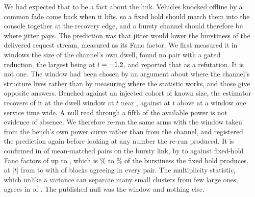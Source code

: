 \documentclass[11pt]{article}
\begin{document}
We had expected that to be a fact about the link. Vehicles knocked offline by a common fade come back when it lifts, so a fixed hold should march them into the console together at the recovery edge, and a bursty channel should therefore be where jitter pays. The prediction was that jitter would lower the burstiness of the delivered request stream, measured as its Fano factor. We first measured it in windows the size of the channel's own dwell, found no pair with a gated reduction, the largest being \jiGeFanoWideSix{} at $t = -1.2{}$, and reported that as a refutation. It is not one. The window had been chosen by an argument about where the channel's structure lives rather than by measuring where the statistic works, and those give opposite answers. Benched against an injected cohort of known size, the estimator recovers \fbBurstWDwell{} of it at the dwell window at $t$ near \fbBurstWDwellT{}, against \fbBurstWOne{} at $t$ above \fbMemWOneT{} at a window one service time wide. A null read through a fifth of the available power is not evidence of absence. We therefore re-ran the same arms with the window taken from the bench's own power curve rather than from the channel, and registered the prediction again before looking at any number the re-run produced. It is confirmed in \frGeRed{} of \frGePairs{} mean-matched pairs on the bursty link, by \frGeMin{} to \frGeMax{} against fixed-hold Fano factors of up to \frGeBase{}, which is \frGeMinPct{}\% to \frGeMaxPct{}\% of the burstiness the fixed hold produces, at $|t|$ from \frGeMinT{} to \frGeMaxT{} with \frGeBlocks{} of \frGeBlocksN{} blocks agreeing in every pair. The multiplicity statistic, which unlike a variance can separate many small clusters from few large ones, agrees in \frExcRed{} of \frExcPairs{}. The published null was the window and nothing else.
\end{document}
